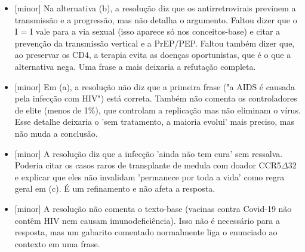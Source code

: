 \documentclass{article}%
\begin{document}
\begin{itemize}%
\item%
{[}minor{]} Na alternativa (b), a resolução diz que os antirretrovirais previnem a transmissão e a progressão, mas não detalha o argumento. Faltou dizer que o I = I vale para a via sexual (isso aparece só nos conceitos{-}base) e citar a prevenção da transmissão vertical e a PrEP/PEP. Faltou também dizer que, ao preservar os CD4, a terapia evita as doenças oportunistas, que é o que a alternativa nega. Uma frase a mais deixaria a refutação completa.%
\item%
{[}minor{]} Em (a), a resolução não diz que a primeira frase ("a AIDS é causada pela infecção com HIV") está correta. Também não comenta os controladores de elite (menos de 1\%), que controlam a replicação mas não eliminam o vírus. Esse detalhe deixaria o 'sem tratamento, a maioria evolui' mais preciso, mas não muda a conclusão.%
\item%
{[}minor{]} A resolução diz que a infecção 'ainda não tem cura' sem ressalva. Poderia citar os casos raros de transplante de medula com doador CCR5$\Delta$32 e explicar que eles não invalidam 'permanece por toda a vida' como regra geral em (c). É um refinamento e não afeta a resposta.%
\item%
{[}minor{]} A resolução não comenta o texto{-}base (vacinas contra Covid{-}19 não contêm HIV nem causam imunodeficiência). Isso não é necessário para a resposta, mas um gabarito comentado normalmente liga o enunciado ao contexto em uma frase.%
\end{itemize}%
\end{document}
